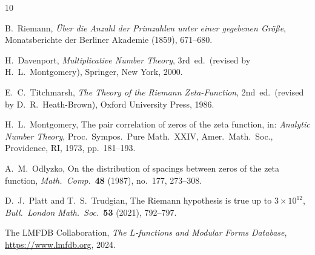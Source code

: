 \documentclass[12pt,a4paper]{amsart}
\theoremstyle{definition}
\begin{document}
\begin{thebibliography}{10}

B.~Riemann,
\emph{\"Uber die Anzahl der Primzahlen unter einer gegebenen Gr\"o\ss e},
Monatsberichte der Berliner Akademie (1859), 671--680.

H.~Davenport,
\emph{Multiplicative Number Theory}, 3rd~ed.\
(revised by H.~L.~Montgomery),
Springer, New York, 2000.

E.~C.~Titchmarsh,
\emph{The Theory of the Riemann Zeta-Function}, 2nd~ed.\
(revised by D.~R.~Heath-Brown),
Oxford University Press, 1986.

H.~L.~Montgomery,
The pair correlation of zeros of the zeta function,
in: \emph{Analytic Number Theory}, Proc.\ Sympos.\ Pure Math.~XXIV,
Amer.\ Math.\ Soc., Providence, RI, 1973, pp.~181--193.

A.~M.~Odlyzko,
On the distribution of spacings between zeros of the zeta function,
\emph{Math.\ Comp.}\ \textbf{48} (1987), no.~177, 273--308.

D.~J.~Platt and T.~S.~Trudgian,
The Riemann hypothesis is true up to $3 \times 10^{12}$,
\emph{Bull.\ London Math.\ Soc.}\ \textbf{53} (2021), 792--797.

\bibitem{LMFDB}
The LMFDB Collaboration,
\emph{The $L$-functions and Modular Forms Database},
\url{https://www.lmfdb.org}, 2024.

\end{thebibliography}
\end{document}
